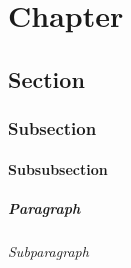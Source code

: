 \chapter{Chapter}
\section{Section}
\subsection{Subsection}
\subsubsection{Subsubsection}
\paragraph{Paragraph}
\subparagraph{Subparagraph}